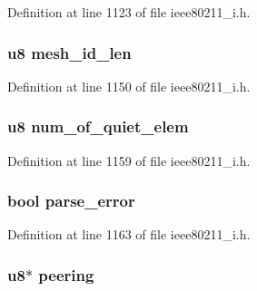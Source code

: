 Definition at line 1123 of file ieee80211\-\_\-i.\-h.

\hypertarget{structieee802__11__elems_a8d28b6eb74e2a40cdbf971786344b947}{
\subsubsection[{mesh\-\_\-id\-\_\-len}]{\setlength{\rightskip}{0pt plus 5cm}u8 mesh\-\_\-id\-\_\-len}}\label{structieee802__11__elems_a8d28b6eb74e2a40cdbf971786344b947}


Definition at line 1150 of file ieee80211\-\_\-i.\-h.

\hypertarget{structieee802__11__elems_aa9bb9f08b902ed1012cb04ac64824f49}{
\subsubsection[{num\-\_\-of\-\_\-quiet\-\_\-elem}]{\setlength{\rightskip}{0pt plus 5cm}u8 num\-\_\-of\-\_\-quiet\-\_\-elem}}\label{structieee802__11__elems_aa9bb9f08b902ed1012cb04ac64824f49}


Definition at line 1159 of file ieee80211\-\_\-i.\-h.

\hypertarget{structieee802__11__elems_a63b1a4ce3aea3d6ed94b79b863d0594d}{
\subsubsection[{parse\-\_\-error}]{\setlength{\rightskip}{0pt plus 5cm}bool parse\-\_\-error}}\label{structieee802__11__elems_a63b1a4ce3aea3d6ed94b79b863d0594d}


Definition at line 1163 of file ieee80211\-\_\-i.\-h.

\hypertarget{structieee802__11__elems_a8f8fc9384b03389900f4b2d557d4a3a4}{
\subsubsection[{peering}]{\setlength{\rightskip}{0pt plus 5cm}u8$\ast$ peering}}\label{structieee802__11__elems_a8f8fc9384b03389900f4b2d557d4a3a4}


